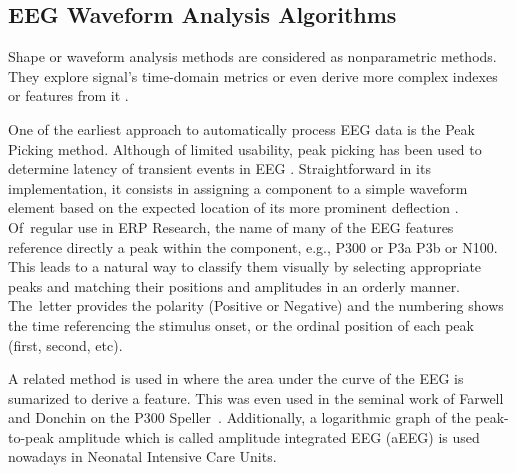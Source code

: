 \documentclass[brainsci,article,accept,moreauthors,pdftex,10pt,a4paper]{mdpi}
\begin{document}
\subsection{EEG Waveform Analysis Algorithms}
\label{Algorithms}

Shape or waveform analysis methods are considered as nonparametric methods.  They explore signal's time-domain metrics or even derive more complex indexes or features from it \citep{Thakor2009}. 

One of the earliest approach to automatically process EEG data is the Peak Picking method.  Although of limited usability, peak picking has been used to determine latency of transient events in EEG \citep{Jaskowski2000,Zhang2011}.  Straightforward in its implementation, it consists in assigning a component to a simple waveform element based on the expected location of its more prominent deflection \citep{Ouyang2017}.  
Of~regular use in ERP Research, the name of many of the EEG features reference directly a peak within the component, e.g., P300 or P3a P3b or N100.  This leads to a natural way to classify them visually by selecting appropriate peaks and matching their positions and amplitudes in an orderly manner.  The~letter provides the polarity (Positive or Negative) and the numbering shows the time referencing the stimulus onset, or the ordinal position of each peak (first, second, etc). 


A related method is used in \citep{Alvarado-Gonzalez2016} where the area under the curve of the EEG is sumarized to derive a feature.  This was even used in the seminal work of Farwell and Donchin on the P300 Speller~\citep{Farwell1988,WolpawJonathanR2012}. Additionally, a logarithmic graph of the peak-to-peak amplitude which is called amplitude integrated EEG (aEEG) \citep{Shah2015} is used nowadays in Neonatal Intensive Care Units.
\end{document}
